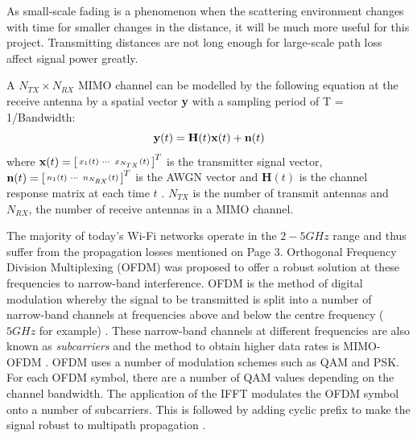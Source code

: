As small-scale fading is a phenomenon when the scattering environment changes with time for smaller changes in the distance, it will be much more useful for this project. Transmitting distances are not long enough for large-scale path loss affect signal power greatly. \par
A $N_{TX}\times N_{RX}$ MIMO channel can be modelled by the following equation at the receive antenna by a spatial vector \textbf{y} with a sampling period of T = 1/Bandwidth:
\vspace{-11pt}
\begin{equation}\label{eqn:2.1}
    \textbf{y}(t) = \textbf{H}(t)\textbf{x}(t)+\textbf{n}(t)
    \vspace{-11pt}
\end{equation}
where  $\textbf{x}(t) = \begin{bsmallmatrix}x_1(t) & \cdots & x_{N_{TX}}(t)\end{bsmallmatrix}^T$ is the transmitter signal vector, $\textbf{n}(t) = \begin{bsmallmatrix}n_1(t) & \cdots & n_{N_{RX}}(t)\end{bsmallmatrix}^T$ is the AWGN vector and $\textbf{H}(t)$ is the channel response matrix at each time $t$ \citep{channelEquations}. $N_{TX}$ is the number of transmit antennas and $N_{RX}$, the number of receive antennas in a MIMO channel.\par
The majority of today's Wi-Fi networks operate in the $2-5GHz$ range and thus suffer from the propagation losses mentioned on Page 3. Orthogonal Frequency Division Multiplexing (OFDM) was proposed to offer a robust solution at these frequencies to narrow-band interference. OFDM is the method of digital modulation whereby the signal to be transmitted is split into a number of narrow-band channels at frequencies above and below the centre frequency ($5GHz$ for example) \citep{OFDM}. 
These narrow-band channels at different frequencies are also known as \textit{subcarriers} and the method to obtain higher data rates is MIMO-OFDM \citep{802.11nStandard}. OFDM uses a number of modulation schemes such as QAM and PSK. For each OFDM symbol, there are a number of QAM values depending on the channel bandwidth. The application of the IFFT modulates the OFDM symbol onto a number of subcarriers. This is followed by adding cyclic prefix to make the signal robust to multipath propagation \citep{OFDM, 802.11nStandard}. \par
